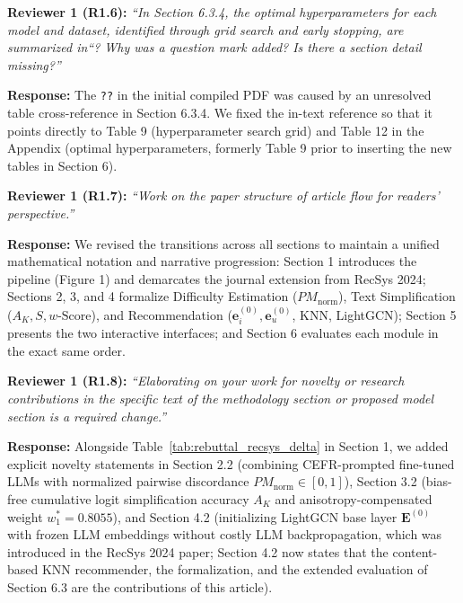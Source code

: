 \documentclass[11pt,a4paper]{article}
\newcommand{\mm}[1]{#1}
\newcommand{\mmhl}[1]{#1}
\begin{document}
\begin{reviewbox}
\textbf{Reviewer 1 (R1.6):} \textit{``In Section 6.3.4, the optimal hyperparameters for each model and dataset, identified through grid search and early stopping, are summarized in``? Why was a question mark added? Is there a section detail missing?''}
\end{reviewbox}

\noindent\textbf{Response:}
The \texttt{??} in the initial compiled PDF was caused by an unresolved table cross-reference in Section 6.3.4. We fixed the in-text reference so that it points directly to Table \mmhl{9} (hyperparameter search grid) and Table \mmhl{12} in the Appendix (optimal hyperparameters, formerly Table 9 prior to inserting the \mm{new} tables in Section 6).

\begin{reviewbox}
\textbf{Reviewer 1 (R1.7):} \textit{``Work on the paper structure of article flow for readers' perspective.''}
\end{reviewbox}

\noindent\textbf{Response:}
We revised the transitions across all sections to maintain a unified mathematical notation and narrative progression: Section 1 introduces the pipeline (Figure 1) and demarcates the journal extension from RecSys 2024; Sections 2, 3, and 4 formalize Difficulty Estimation ($PM_{\text{norm}}$), Text Simplification ($A_K, S, w\text{-Score}$), and Recommendation ($\mathbf{e}_i^{(0)}, \mathbf{e}_u^{(0)}$, KNN, LightGCN); Section 5 presents the two interactive interfaces; and Section 6 evaluates each module in the exact same order.

\begin{reviewbox}
\textbf{Reviewer 1 (R1.8):} \textit{``Elaborating on your work for novelty or research contributions in the specific text of the methodology section or proposed model section is a required change.''}
\end{reviewbox}

\noindent\textbf{Response:}
Alongside Table~\ref{tab:rebuttal_recsys_delta} in Section 1, we added explicit novelty statements in Section 2.2 (combining CEFR-prompted fine-tuned LLMs with normalized pairwise discordance $PM_{\text{norm}} \in [0, 1]$), Section 3.2 (bias-free cumulative logit simplification accuracy $A_K$ and anisotropy-compensated weight $w_1^* = 0.8055$), and Section 4.2 (initializing LightGCN base layer $\mathbf{E}^{(0)}$ with frozen LLM embeddings without costly LLM backpropagation\mm{, which was introduced in the RecSys 2024 paper; Section 4.2 now states that the content-based KNN recommender, the formalization, and the extended evaluation of Section 6.3 are the contributions of this article}).
\end{document}
